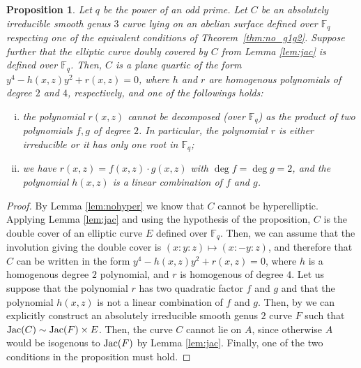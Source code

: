 \documentclass[11pt]{amsart}
\newcommand\Fq{\mathbb{F}_q}
\def\Jac{\mathop{\rm Jac}\nolimits}
\def\Jac{\mathop{\rm Jac}\nolimits}
\theoremstyle{plain}
\newtheorem{proposition}[theorem]{Proposition}
\theoremstyle{definition}
\begin{document}
\begin{proposition} 
    Let $q$ be the power of an odd prime. Let $C$ be an absolutely irreducible smooth genus $3$ curve lying on an abelian surface defined over $\Fq$  respecting one of the equivalent conditions of Theorem~\ref{thm:no_g1g2}. Suppose further that the elliptic curve doubly covered by $C$ from Lemma \ref{lem:jac} is defined over $\Fq$. 
    Then, $C$ is a plane quartic of the form $y^4-h(x,z)y^2+r(x,z)=0$, where $h$ and $r$ are homogenous polynomials of degree $2$ and $4$, respectively, and one of the followings holds:
    \begin{enumerate}[(i)]
        \item the polynomial $r(x,z)$ cannot be decomposed (over $\Fq$) as the product of two polynomials $f,g$ of degree $2$. In particular, the polynomial $r$ is either irreducible or it has only one root in $\Fq$;
        \item we have $r(x,z)=f(x,z)\cdot g(x,z)$ with $\deg f = \deg g =2$, and the polynomial $h(x,z)$ is a linear combination of $f$ and $g$.
    \end{enumerate}
\end{proposition}
\begin{proof}
    By Lemma \ref{lem:nohyper} we know that $C$ cannot be hyperelliptic. Applying Lemma \ref{lem:jac} and using the hypothesis of the proposition, $C$ is the double cover of an elliptic curve $E$ defined over $\Fq$. Then, we can assume that the involution giving the double cover is $(x:y:z)\mapsto (x:-y:z)$, and therefore that $C$ can be written in the form $y^4-h(x,z)y^2+r(x,z)=0$, where $h$ is a homogenous degree $2$ polynomial, and $r$ is homogenous of degree $4$. Let us suppose that the polynomial $r$ has two quadratic factor $f$ and $g$ and that the polynomial $h(x,z)$ is not a linear combination of $f$ and $g$. Then, by  \cite[Thm.~1.1]{RR18} we can explicitly construct an absolutely irreducible smooth genus $2$ curve $F$ such that $\Jac(C) \sim \Jac(F)\times E$.  Then, the curve $C$ cannot lie on $A$, since otherwise $A$ would be isogenous to $\Jac(F)$ by Lemma \ref{lem:jac}. Finally, one of the two conditions in the proposition must hold.
\end{proof}
\end{document}
